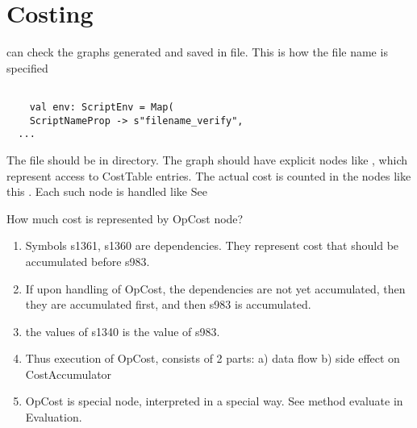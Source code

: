 \section{Costing}
\label{sec:costing}

can check the graphs generated and saved in file.
This is how the file name is specified
\begin{lstlisting}  

    val env: ScriptEnv = Map(
    ScriptNameProp -> s"filename_verify",
  ...
\end{lstlisting}  

The file should be in  directory. The graph should have
explicit nodes like , which represent access to CostTable
entries. The actual cost is counted in the nodes like this . Each such node is handled like
See 

How much cost is represented by OpCost node?
\begin{enumerate}
    \item Symbols s1361, s1360 are dependencies. They represent cost that
    should be accumulated before s983. 
    \item If upon handling of OpCost, the dependencies are not yet
    accumulated, then they are accumulated first, and then s983 is
    accumulated.
    \item the values of s1340 is the value of s983.
    \item Thus execution of OpCost, consists of 2 parts: a) data flow b) side
    effect on CostAccumulator
    \item OpCost is special node, interpreted in a special way. See method
    evaluate in Evaluation.
\end{enumerate}
